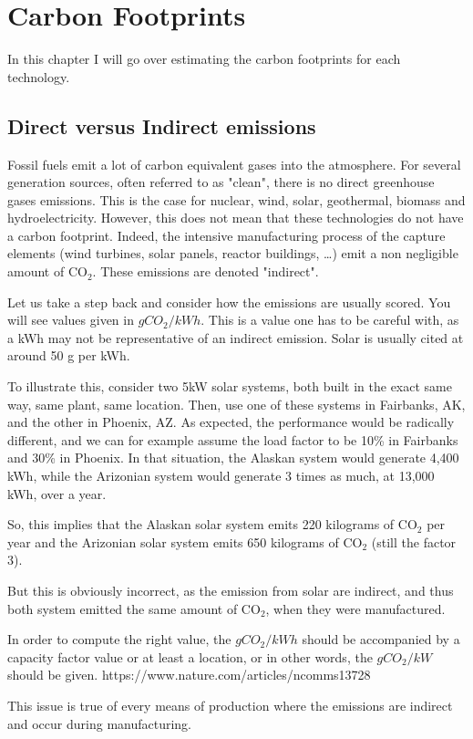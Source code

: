 \setchapterpreamble[u]{\margintoc}
\chapter{Carbon Footprints}

In this chapter I will go over estimating the carbon footprints for each technology.



\section{Direct versus Indirect emissions}

Fossil fuels emit a lot of carbon equivalent gases into the atmosphere. For several generation sources, often referred to as "clean", there is no direct greenhouse gases emissions. This is the case for nuclear, wind, solar, geothermal, biomass and hydroelectricity. However, this does not mean that these technologies do not have a carbon footprint. Indeed, the intensive manufacturing process of the capture elements (wind turbines, solar panels, reactor buildings, \ldots) emit a non negligible amount of $\mathrm{CO_2}$. These emissions are denoted "indirect".

\begin{kaobox}[frametitle=A look at some values]

Let us take a step back and consider how the emissions are usually scored. You will see values given in $gCO_2/kWh$. This is a value one has to be careful with, as a kWh may not be representative of an indirect emission. Solar is usually cited at around 50 g per kWh.

To illustrate this, consider two 5kW solar systems, both built in the exact same way, same plant, same location. Then, use one of these systems in Fairbanks, AK, and the other in Phoenix, AZ. As expected, the performance would be radically different, and we can for example assume the load factor to be 10\% in Fairbanks and 30\% in Phoenix. In that situation, the Alaskan system would generate 4,400 kWh, while the Arizonian system would generate 3 times as much, at 13,000 kWh, over a year.

So, this implies that the Alaskan solar system emits 220 kilograms of $\mathrm{CO_2}$
per year and the Arizonian solar system emits 650 kilograms of $\mathrm{CO_2}$ (still the factor 3).

But this is obviously incorrect, as the emission from solar are indirect, and thus both system emitted the same amount of $\mathrm{CO_2}$, when they were manufactured.

In order to compute the right value, the $gCO_2/kWh$ should be accompanied by a capacity factor value or at least a location, or in other words, the $gCO_2/kW$ should be given.
https://www.nature.com/articles/ncomms13728

This issue is true of every means of production where the emissions are indirect and occur during manufacturing.

\end{kaobox}



